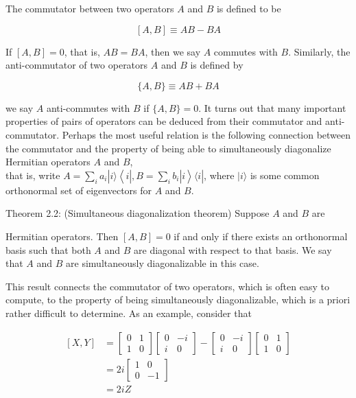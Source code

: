 \documentclass[
	11pt, %
	fleqn, %
	a4paper, %
]{LegrandOrangeBook}
\begin{document}
The commutator between two operators $A$ and $B$ is defined to be

$$
[A, B] \equiv A B-B A
$$

If $[A, B]=0$, that is, $A B=B A$, then we say $A$ commutes with $B$. Similarly, the anti-commutator of two operators $A$ and $B$ is defined by

$$
\{A, B\} \equiv A B+B A
$$

we say $A$ anti-commutes with $B$ if $\{A, B\}=0$. It turns out that many important properties of pairs of operators can be deduced from their commutator and anti-commutator. Perhaps the most useful relation is the following connection between the commutator and the property of being able to simultaneously diagonalize Hermitian operators $A$ and $B$,\\
that is, write $A=\sum_{i} a_{i}|i\rangle\left\langle i\left|, B=\sum_{i} b_{i}\right| i\right\rangle\langle i|$, where $|i\rangle$ is some common orthonormal set of eigenvectors for $A$ and $B$.

Theorem 2.2: (Simultaneous diagonalization theorem) Suppose $A$ and $B$ are

Hermitian operators. Then $[A, B]=0$ if and only if there exists an orthonormal basis such that both $A$ and $B$ are diagonal with respect to that basis. We say that $A$ and $B$ are simultaneously diagonalizable in this case.

This result connects the commutator of two operators, which is often easy to compute, to the property of being simultaneously diagonalizable, which is a priori rather difficult to determine. As an example, consider that

$$
\begin{aligned}
{[X, Y] } & =\left[\begin{array}{ll}
0 & 1 \\
1 & 0
\end{array}\right]\left[\begin{array}{rr}
0 & -i \\
i & 0
\end{array}\right]-\left[\begin{array}{rr}
0 & -i \\
i & 0
\end{array}\right]\left[\begin{array}{ll}
0 & 1 \\
1 & 0
\end{array}\right] \\
& =2 i\left[\begin{array}{rr}
1 & 0 \\
0 & -1
\end{array}\right] \\
& =2 i Z
\end{aligned}
$$
\end{document}
